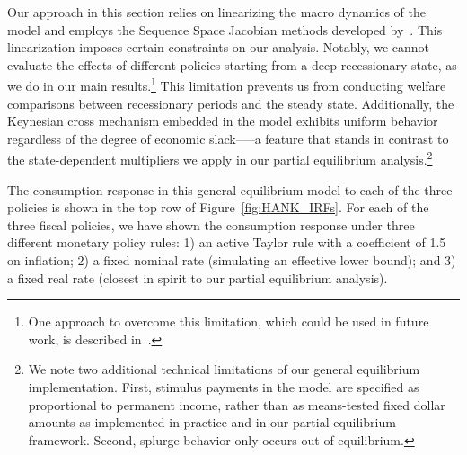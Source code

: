 \documentclass[qe]{econsocart}
\begin{document}
Our approach in this section relies on linearizing the macro dynamics of the model and employs the Sequence Space Jacobian methods developed by~\cite{Auclert2021}. This linearization imposes certain constraints on our analysis. Notably, we cannot evaluate the effects of different policies starting from a deep recessionary state, as we do in our main results.\footnote{One approach to overcome this limitation, which could be used in future work, is described in~\cite{bkmMitShocks}.} This limitation prevents us from conducting welfare comparisons between recessionary periods and the steady state. Additionally, the Keynesian cross mechanism embedded in the model exhibits uniform behavior regardless of the degree of economic slack—--a feature that stands in contrast to the state-dependent multipliers we apply in our partial equilibrium analysis.\footnote{We note two additional technical limitations of our general equilibrium implementation. First, stimulus payments in the model are specified as proportional to permanent income, rather than as means-tested fixed dollar amounts as implemented in practice and in our partial equilibrium framework. Second, splurge behavior only occurs out of equilibrium.}

The consumption response in this general equilibrium model to each of the three policies is shown in the top row of Figure~\ref{fig:HANK_IRFs}. For each of the three fiscal policies, we have shown the consumption response under three different monetary policy rules: 1) an active Taylor rule with a coefficient of 1.5 on inflation; 2) a fixed nominal rate (simulating an effective lower bound); and 3) a fixed real rate (closest in spirit to our partial equilibrium analysis).

\end{document}
